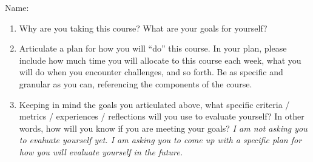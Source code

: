 \documentclass[12pt,letterpaper,noanswers]{exam}
\begin{document}
 \pdfpageheight 11in 
  \pdfpagewidth 8.5in
\noindent  Name:

\begin{enumerate}
    \item Why are you taking this course? What are your goals for yourself?
    \vspace{3.5in}
    
\item Articulate a plan for how you will “do” this course. In your plan, please include how much time you will allocate to this course each week, what you will do when you encounter challenges, and so forth. Be as specific and granular as you can, referencing the components of the course.
\vspace{3in}
\eject
\item Keeping in mind the goals you articulated above, what specific criteria / metrics / experiences / reflections will you use to evaluate yourself? In other words, how will you know if you are meeting your goals? \emph{I am not asking you to evaluate yourself yet. I am asking you to come up with a specific plan for how you will evaluate yourself in the future.}
\vspace{2in}

\end{enumerate}
\end{document}
